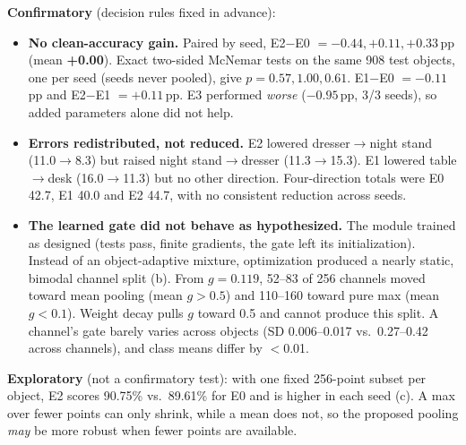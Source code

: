 \documentclass[10pt]{article}
\begin{document}
\textbf{Confirmatory} (decision rules fixed in advance):
\begin{itemize}
\item \textbf{No clean-accuracy gain.} Paired by seed, E2$-$E0 $=-0.44,+0.11,+0.33$\,pp (mean \textbf{+0.00}). Exact two-sided McNemar tests on the same 908 test objects, one per seed (seeds never pooled), give $p=0.57, 1.00, 0.61$. E1$-$E0 $=-0.11$\,pp and E2$-$E1 $=+0.11$\,pp. E3 performed \emph{worse} ($-0.95$\,pp, 3/3 seeds), so added parameters alone did not help.
\item \textbf{Errors redistributed, not reduced.} E2 lowered dresser$\to$night stand (11.0$\to$8.3) but raised night stand$\to$dresser (11.3$\to$15.3). E1 lowered table$\to$desk (16.0$\to$11.3) but no other direction. Four-direction totals were E0 42.7, E1 40.0 and E2 44.7, with no consistent reduction across seeds.
\item \textbf{The learned gate did not behave as hypothesized.} The module trained as designed (tests pass, finite gradients, the gate left its initialization). Instead of an object-adaptive mixture, optimization produced a nearly static, bimodal channel split (b). From $g{=}0.119$, 52--83 of 256 channels moved toward mean pooling (mean $g>0.5$) and 110--160 toward pure max (mean $g<0.1$). Weight decay pulls $g$ toward 0.5 and cannot produce this split. A channel's gate barely varies across objects (SD 0.006--0.017 vs.\ 0.27--0.42 across channels), and class means differ by $<$0.01.
\end{itemize}
\textbf{Exploratory} (not a confirmatory test): with one fixed 256-point subset per object, E2 scores 90.75\% vs.\ 89.61\% for E0 and is higher in each seed (c). A max over fewer points can only shrink, while a mean does not, so the proposed pooling \emph{may} be more robust when fewer points are available.
\end{document}
